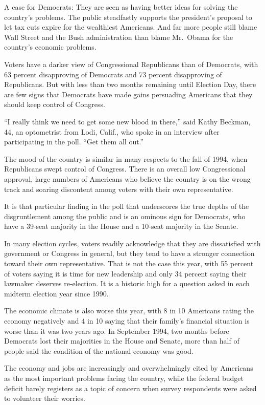 ﻿\documentclass[12pt]{article}
\begin{document}
A case for Democrats: They are seen as having better ideas for solving the country's problems. The
public steadfastly supports the president's proposal to let tax cuts expire for the wealthiest
Americans. And far more people still blame Wall Street and the Bush administration than blame
Mr.~Obama for the country's economic problems.

Voters have a darker view of Congressional Republicans than of Democrats, with 63 percent
disapproving of Democrats and 73 percent disapproving of Republicans. But with less than two months
remaining until Election Day, there are few signs that Democrats have made gains persuading
Americans that they should keep control of Congress.

``I really think we need to get some new blood in there,'' said Kathy Beckman, 44, an optometrist
from Lodi, Calif., who spoke in an interview after participating in the poll. ``Get them all out.''

The mood of the country is similar in many respects to the fall of 1994, when Republicans swept
control of Congress. There is an overall low Congressional approval, large numbers of Americans who
believe the country is on the wrong track and soaring discontent among voters with their own
representative.

It is that particular finding in the poll that underscores the true depths of the disgruntlement
among the public and is an ominous sign for Democrats, who have a 39-seat majority in the House and
a 10-seat majority in the Senate.

In many election cycles, voters readily acknowledge that they are dissatisfied with government or
Congress in general, but they tend to have a stronger connection toward their own representative.
That is not the case this year, with 55 percent of voters saying it is time for new leadership and
only 34 percent saying their lawmaker deserves re-election. It is a historic high for a question
asked in each midterm election year since 1990.

The economic climate is also worse this year, with 8 in 10 Americans rating the economy negatively
and 4 in 10 saying that their family's financial situation is worse than it was two years ago. In
September 1994, two months before Democrats lost their majorities in the House and Senate, more than
half of people said the condition of the national economy was good.

The economy and jobs are increasingly and overwhelmingly cited by Americans as the most important
problems facing the country, while the federal budget deficit barely registers as a topic of concern
when survey respondents were asked to volunteer their worries.
\end{document}
